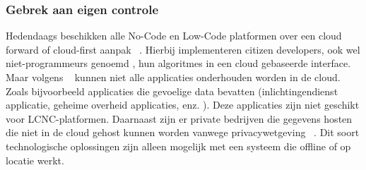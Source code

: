 \subsubsection*{Gebrek aan eigen controle}
\label{subsec:gebrek-aan-eigen-controle}
Hedendaags beschikken alle No-Code en Low-Code platformen over een cloud forward of cloud-first aanpak ~\autocite{Sufi_2023}. 
Hierbij implementeren citizen developers, ook wel niet-programmeurs genoemd , hun algoritmes in een cloud gebaseerde interface. 
Maar volgens ~\textcite{Sufi_2023} kunnen niet alle applicaties onderhouden worden in de cloud. Zoals bijvoorbeeld applicaties die gevoelige data bevatten 
(inlichtingendienst applicatie, geheime overheid applicaties, enz. ). Deze applicaties zijn niet geschikt voor LCNC-platformen. 
Daarnaast zijn er private bedrijven die gegevens hosten die niet in de cloud gehost kunnen worden vanwege privacywetgeving ~\autocite{Sufi_2023}. 
Dit soort technologische oplossingen zijn alleen mogelijk met een systeem die offline of op locatie werkt.
